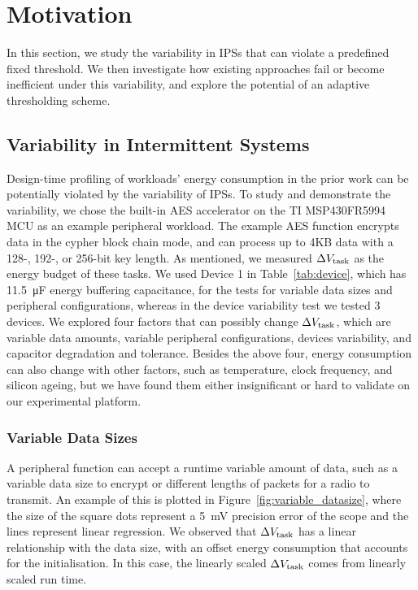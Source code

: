 \section{Motivation} 
\label{sec:design_exploration}

In this section, we study the variability in IPSs that can violate a predefined fixed threshold. 
We then investigate how existing approaches fail or become inefficient under this variability, and explore the potential of an adaptive thresholding scheme. 

\subsection{Variability in Intermittent Systems} 
\label{subsec:dynamic_energy_consumption}
 
Design-time profiling of workloads' energy consumption in the prior work can be potentially violated by the variability of IPSs.
To study and demonstrate the variability, we chose the built-in AES accelerator on the TI MSP430FR5994 MCU as an example peripheral workload.  
The example AES function encrypts data in the cypher block chain mode, and can process up to 4KB data with a 128-, 192-, or 256-bit key length. 
As mentioned, we measured $\Delta V_{\text{task}}$ as the energy budget of these tasks.
We used Device 1 in Table~\ref{tab:device}, which has \SI{11.5}{\micro\farad} energy buffering capacitance, for the tests for variable data sizes and peripheral configurations, whereas in the device variability test we tested 3 devices.
We explored four factors that can possibly change $\Delta V_{\text{task}}$, which are variable data amounts, variable peripheral configurations, devices variability, and capacitor degradation and tolerance. 
Besides the above four, energy consumption can also change with other factors, such as temperature, clock frequency, and silicon ageing, but we have found them either insignificant or hard to validate on our experimental platform. 




\subsubsection{Variable Data Sizes}

A peripheral function can accept a runtime variable amount of data, such as a variable data size to encrypt or different lengths of packets for a radio to transmit. 
An example of this is plotted in Figure~\ref{fig:variable_datasize}, where the size of the square dots represent a \SI{5}{\milli\volt} precision error of the scope and the lines represent linear regression. 
We observed that $\Delta V_{\text{task}}$ has a linear relationship with the data size, with an offset energy consumption that accounts for the initialisation. 
In this case, the linearly scaled $\Delta V_{\text{task}}$ comes from linearly scaled run time. 

